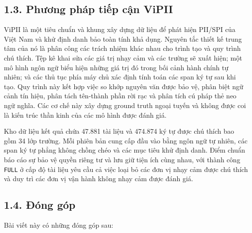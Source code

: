 \documentclass[
  11pt,
  a4paper,
]{article}
\begin{document}
\subsection{1.3. Phương pháp tiếp cận
ViPII}\label{phux1b0ux1a1ng-phuxe1p-tiux1ebfp-cux1eadn-vipii}

ViPII là một tiêu chuẩn và khung xây dựng dữ liệu để phát hiện PII/SPI
của Việt Nam và khử định danh bảo toàn tính khả dụng. Nguyên tắc thiết
kế trung tâm của nó là phân công các trách nhiệm khác nhau cho trình tạo
và quy trình chú thích. Tệp kê khai sửa các giá trị nhạy cảm và các
trường sẽ xuất hiện; một mô hình ngôn ngữ biểu hiện những giá trị đó
trong bối cảnh hành chính tự nhiên; và các thủ tục phía máy chủ xác định
tính toán các span ký tự sau khi tạo. Quy trình này kết hợp việc so khớp
nguyên văn được bảo vệ, phân biệt ngữ cảnh tín hiệu, phân tách tên-thành
phần rời rạc và phân tích cú pháp thẻ neo ngữ nghĩa. Các cơ chế này xây
dựng ground truth ngoại tuyến và không được coi là kiến
\hspace{0pt}\hspace{0pt}trúc thần kinh của các mô hình được đánh giá.

Kho dữ liệu kết quả chứa 47.881 tài liệu và 474.874 ký tự được chú thích
bao gồm 34 lớp trường. Mỗi phiên bản cung cấp đầu vào bằng ngôn ngữ tự
nhiên, các span ký tự phẳng không chồng chéo và các mục tiêu khử định
danh. Điểm chuẩn báo cáo sự bảo vệ quyền riêng tư và lưu giữ tiện ích
cùng nhau, với thành công \texttt{FULL} ở cấp độ tài liệu yêu cầu cả
việc loại bỏ các đơn vị nhạy cảm được chú thích và duy trì các đơn vị
vận hành không nhạy cảm được đánh giá.

\subsection{1.4. Đóng góp}\label{ux111uxf3ng-guxf3p}

Bài viết này có những đóng góp sau:
\end{document}
